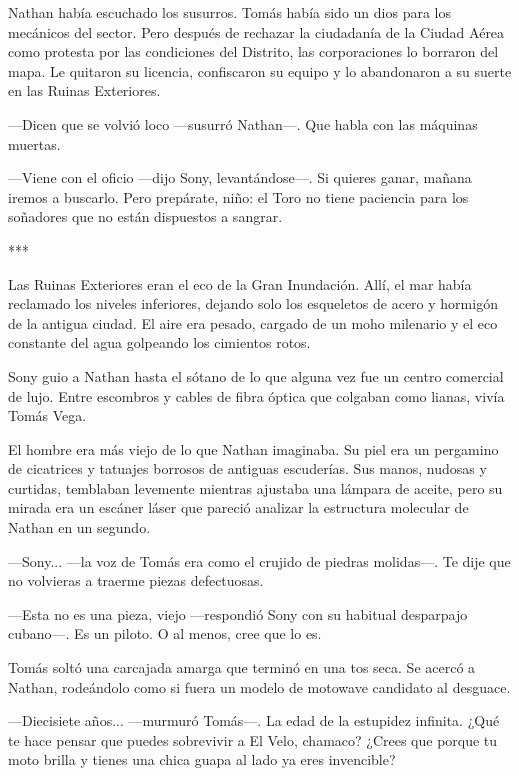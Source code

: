 \documentclass[11pt,twoside]{book}
\begin{document}
Nathan había escuchado los susurros. Tomás había sido un dios para los mecánicos del sector. Pero después de rechazar la ciudadanía de la Ciudad Aérea como protesta por las condiciones del Distrito, las corporaciones lo borraron del mapa. Le quitaron su licencia, confiscaron su equipo y lo abandonaron a su suerte en las Ruinas Exteriores.

---Dicen que se volvió loco ---susurró Nathan---. Que habla con las máquinas muertas.

---Viene con el oficio ---dijo Sony, levantándose---. Si quieres ganar, mañana iremos a buscarlo. Pero prepárate, niño: el Toro no tiene paciencia para los soñadores que no están dispuestos a sangrar.

\bigskip
\begin{center}***\end{center}
\bigskip

Las Ruinas Exteriores eran el eco de la Gran Inundación. Allí, el mar había reclamado los niveles inferiores, dejando solo los esqueletos de acero y hormigón de la antigua ciudad. El aire era pesado, cargado de un moho milenario y el eco constante del agua golpeando los cimientos rotos.

Sony guio a Nathan hasta el sótano de lo que alguna vez fue un centro comercial de lujo. Entre escombros y cables de fibra óptica que colgaban como lianas, vivía Tomás Vega.

El hombre era más viejo de lo que Nathan imaginaba. Su piel era un pergamino de cicatrices y tatuajes borrosos de antiguas escuderías. Sus manos, nudosas y curtidas, temblaban levemente mientras ajustaba una lámpara de aceite, pero su mirada era un escáner láser que pareció analizar la estructura molecular de Nathan en un segundo.

---Sony... ---la voz de Tomás era como el crujido de piedras molidas---. Te dije que no volvieras a traerme piezas defectuosas.

---Esta no es una pieza, viejo ---respondió Sony con su habitual desparpajo cubano---. Es un piloto. O al menos, cree que lo es.

Tomás soltó una carcajada amarga que terminó en una tos seca. Se acercó a Nathan, rodeándolo como si fuera un modelo de motowave candidato al desguace.

---Diecisiete años... ---murmuró Tomás---. La edad de la estupidez infinita. ¿Qué te hace pensar que puedes sobrevivir a El Velo, chamaco? ¿Crees que porque tu moto brilla y tienes una chica guapa al lado ya eres invencible?
\end{document}

